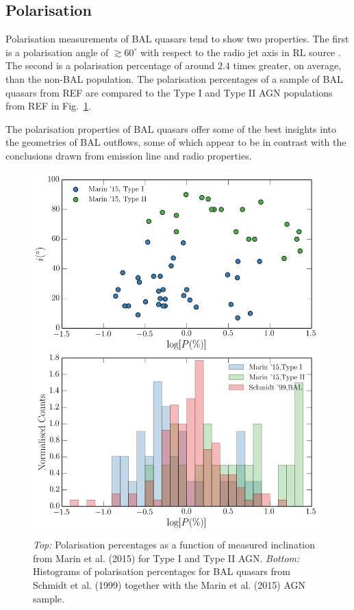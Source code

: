 \subsection{Polarisation}

Polarisation measurements of BAL quasars tend to show two properties.
The first is a polarisation angle of $\gtrsim60^\circ$ with respect
to the radio jet axis in RL source \citep{brotherton2006}. The second
is a polarisation percentage of around $2.4$ times greater, on average, than the 
non-BAL population. The polarisation percentages of a sample of BAL quasars from REF
are compared to the Type I and Type II AGN populations from REF in 
Fig.~\ref{fig:bal_polarisation}.

The polarisation properties of BAL quasars offer some of
the best insights into the geometries of BAL outflows, some of which
appear to be in contrast with the conclusions drawn from emission
line and radio properties.

\begin{figure}
\centering
\includegraphics[width=1.0\textwidth]{figures/ewpaper/hist_p.png}
\caption
{
{\sl Top:} 
Polarisation percentages as a function of measured inclination from
Marin et al. (2015) for Type I and Type II AGN.
{\sl Bottom:} Histograms of polarisation percentages 
for BAL quasars from Schmidt et al. (1999) together with the 
Marin et al. (2015) AGN sample. 
}
\label{fig:bal_polarisation}
\end{figure}



